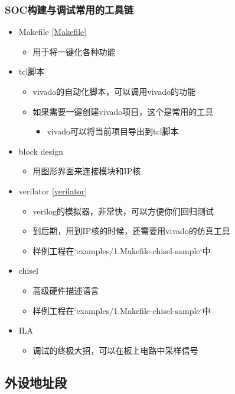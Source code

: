 \documentclass[lang=cn,11pt,a4paper]{elegantpaper}
\begin{document}
\subsubsection{SOC构建与调试常用的工具链}
\begin{itemize}
\item Makefile \ref{Makefile}
  \begin{itemize}
  \item 用于将一键化各种功能
  \end{itemize}
\item tcl脚本
  \begin{itemize}
  \item vivado的自动化脚本，可以调用vivado的功能
  \item 如果需要一键创建vivado项目，这个是常用的工具
    \begin{itemize}
    \item vivado可以将当前项目导出到tcl脚本
    \end{itemize}
  \end{itemize}
\item block design
  \begin{itemize}
  \item 用图形界面来连接模块和IP核
  \end{itemize}
\item verilator \ref{verilator}
  \begin{itemize}
  \item verilog的模拟器，非常快，可以方便你们回归测试
  \item 到后期，用到IP核的时候，还需要用vivado的仿真工具
  \item 样例工程在`examples/1.Makefile-chisel-sample`中
  \end{itemize}
\item chisel
  \begin{itemize}
  \item 高级硬件描述语言
  \item 样例工程在`examples/1.Makefile-chisel-sample`中
  \end{itemize}
\item ILA
  \begin{itemize}
  \item 调试的终极大招，可以在板上电路中采样信号
  \end{itemize}
\end{itemize}

\subsection{外设地址段}
\end{document}
